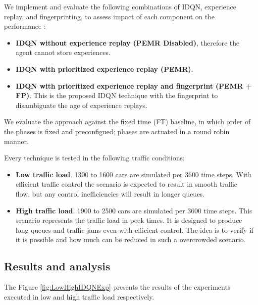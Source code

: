 \documentclass{llncs}
\begin{document}
We implement and evaluate the following combinations of IDQN, experience replay, and fingerprinting, to assess impact of each component on the performance :


\begin{itemize}
\item \textbf{IDQN without experience replay (PEMR Disabled)}, therefore the agent cannot store experiences.
\item \textbf{IDQN with prioritized experience replay (PEMR)}. 
\item \textbf{IDQN with prioritized experience replay and fingerprint (PEMR + FP)}. This is the proposed IDQN technique with the fingerprint to disambiguate the age of experience replays.
\end{itemize}

We evaluate the approach against the fixed time (FT) baseline, in which order of the phases is fixed and preconfigued; phases are actuated in a round robin manner. 

Every technique is tested in the following traffic conditions:

\begin{itemize}
\item \textbf{Low traffic load}. 1300 to 1600 cars are simulated per 3600 time steps. With efficient traffic control the scenario is expected to result in smooth traffic flow, but any control inefficiencies will result in longer queues. 
\item \textbf{High traffic load}. 1900 to 2500 cars are simulated per 3600 time steps.  This scenario represents the traffic load in peek times. It is designed to produce long queues and traffic jams even with efficient control. The idea is to verify if it is possible and how much can be reduced in such a overcrowded scenario. 
\end{itemize}


\subsection{Results and analysis}

The Figure \ref{fig:LowHighIDQNExp} presents the results of the experiments executed in low and high traffic load respectively.
\end{document}
